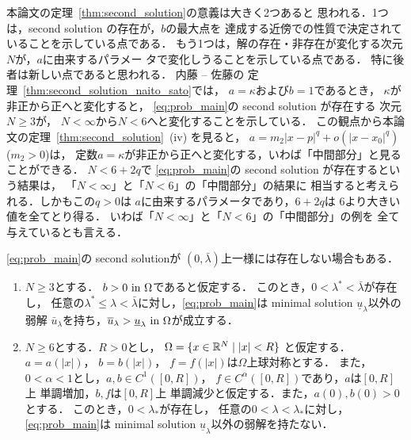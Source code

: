 本論文の定理~\ref{thm:second_solution}の意義は大きく2つあると
思われる．1つは，second solution の存在が，$b$の最大点を
達成する近傍での性質で決定されていることを示している点である．
もう1つは，解の存在・非存在が変化する次元$N$が，$a$に由来するパラメー
タで変化しうることを示している点である．
特に後者は新しい点であると思われる．
内藤 -- 佐藤の
定理~\ref{thm:second_solution_naito_sato}では，
$a = \kappa$および$b = 1$であるとき，
$\kappa$が非正から正へと変化すると，
\ref{eq:prob_main}の second solution が存在する
次元$N \geq 3$が，
$N < \infty$から$N < 6$へと変化することを示している．
この観点から本論文の定理~\ref{thm:second_solution}~(iv) を見ると，
$a = m_2 \lvert x - p \rvert^{q} + o(\lvert x-x_0
\rvert^{q})$ ($m_2 > 0$)は，
定数$a = \kappa$が非正から正へと変化する，いわば「中間部分」と見ることができる．
$N < 6 + 2q$で
\ref{eq:prob_main}の second solution が存在するという結果は，
「$N < \infty$」と「$N < 6$」の「中間部分」の結果に
相当すると考えられる．しかもこの$q > 0$は
$a$に由来するパラメータであり，$6 + 2q$は
$6$より大きい値を全てとり得る．
いわば「$N < \infty$」と「$N < 6$」の「中間部分」の例を
全て与えているとも言える．

\ref{eq:prob_main}の second solutionが
$(0, \bar{\lambda})$上一様には存在しない場合もある．

\begin{thm} \label{thm:second_solution_nonex}
 \begin{enumerate}[1.]  \sage
  \item $N \geq 3$とする．
        $b > 0 ~\text{in}~ \Omega$であると仮定する．
        このとき，$0 < \lambda^* < \bar{\lambda}$が存在し，
        任意の$\lambda^* \leq
        \lambda < \bar{\lambda}$に対し，\ref{eq:prob_main}は
        minimal solution $\underline{u}_\lambda$以外の弱解
        $\bar{u}_\lambda$を持ち，$\overline{u}_\lambda >
        \underline{u}_\lambda ~\text{in}~ \Omega$が成立する．
  \item $N \geq 6$とする．$R > 0$とし，
        $\Omega = \{ x \in \mathbb{R}^N \mid \lvert x \rvert < R\}$
        と仮定する．
        $a = a(\lvert x \rvert)$，
        $b = b(\lvert x \rvert)$，
        $f = f(\lvert x \rvert)$は$\Omega$上球対称とする．
        また，$0 < \alpha < 1$とし，$a , b \in C^1([0, R])$，
        $f \in C^\alpha([0, R])$であり，$a$は$[0, R]$上
        単調増加，$b, f$は$[0, R]$上
        単調減少と仮定する．また，$a(0), b(0) > 0$とする．
        このとき，$0 < \lambda_*$が存在し，
        任意の$0 < \lambda < \lambda_*$に対し，
        \ref{eq:prob_main}は
        minimal solution $\underline{u}_\lambda$以外の弱解を持たない．
 \end{enumerate}
\end{thm}

